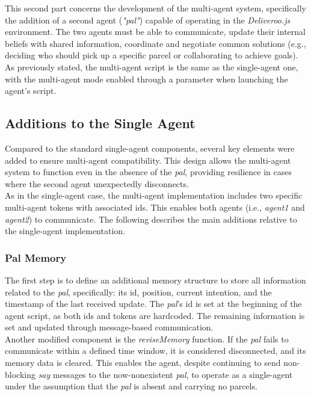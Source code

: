     This second part concerns the development of the multi-agent system, specifically the addition of a second agent (\textit{"pal"}) capable of operating in the \textit{Deliveroo.js} environment. The two agents must be able to communicate, update their internal beliefs with shared information, coordinate and negotiate common solutions (e.g., deciding who should pick up a specific parcel or collaborating to achieve goals).
    \medskip\\ 
    As previously stated, the multi-agent script is the same as the single-agent one, with the multi-agent mode enabled through a parameter when launching the agent's script.

    \subsection{Additions to the Single Agent}
        Compared to the standard single-agent components, several key elements were added to ensure multi-agent compatibility. This design allows the multi-agent system to function even in the absence of the \textit{pal}, providing resilience in cases where the second agent unexpectedly disconnects.
        \medskip\\
        As in the single-agent case, the multi-agent implementation includes two specific multi-agent tokens with associated ids. This enables both agents (i.e., \textit{agent1} and \textit{agent2}) to communicate. The following describes the main additions relative to the single-agent implementation.


        \subsubsection{Pal Memory}
            The first step is to define an additional memory structure to store all information related to the \textit{pal}, specifically: its id, position, current intention, and the timestamp of the last received update. The \textit{pal}'s id is set at the beginning of the agent script, as both ids and tokens are hardcoded. The remaining information is set and updated through message-based communication.
            \medskip\\
            Another modified component is the \textit{reviseMemory} function. If the \textit{pal} fails to communicate within a defined time window, it is considered disconnected, and its memory data is cleared. This enables the agent, despite continuing to send non-blocking \textit{say} messages to the now-nonexistent \textit{pal}, to operate as a single-agent under the assumption that the \textit{pal} is absent and carrying no parcels.

